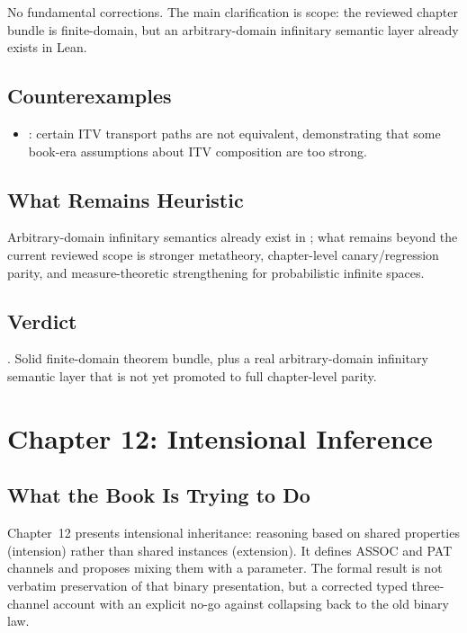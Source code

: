 \documentclass[11pt,openany]{report}
\begin{document}
No fundamental corrections.  The main clarification is scope: the
reviewed chapter bundle is finite-domain, but an arbitrary-domain
infinitary semantic layer already exists in Lean.

\section{Counterexamples}

\begin{itemize}
\item {}: certain ITV
  transport paths are not equivalent, demonstrating that some book-era
  assumptions about ITV composition are too strong.
\end{itemize}

\section{What Remains Heuristic}

Arbitrary-domain infinitary semantics already exist in
; what remains
beyond the current reviewed scope is stronger metatheory, chapter-level
canary/regression parity, and measure-theoretic strengthening for
probabilistic infinite spaces.

\section{Verdict}

\verdictAssumption{}.  Solid finite-domain theorem bundle, plus a real
arbitrary-domain infinitary semantic layer that is not yet promoted to
full chapter-level parity.


\chapter{Chapter 12: Intensional Inference}
\label{ch:review-ch12}

\section{What the Book Is Trying to Do}

Chapter~12 presents intensional inheritance: reasoning based on shared
properties (intension) rather than shared instances (extension).
It defines ASSOC and PAT channels and proposes mixing them with a
parameter.  The formal result is not verbatim preservation of that
binary presentation, but a corrected typed three-channel account with
an explicit no-go against collapsing back to the old binary law.
\end{document}
